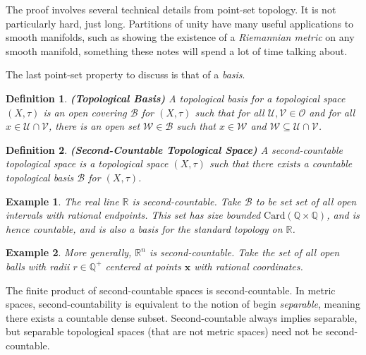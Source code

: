 \documentclass{article}
\theoremstyle{plain}
\theoremstyle{normal}
\newtheorem{definition}{Definition}[section]
\newtheorem{example}{Example}[section]
\begin{document}
        The proof involves several technical details from point-set topology.
        It is not particularly hard, just long. Partitions of unity have many
        useful applications to smooth manifolds, such as showing the existence
        of a \textit{Riemannian metric} on any smooth manifold, something these
        notes will spend a lot of time talking about.
        \par\hfill\par
        The last point-set property to discuss is that of a \textit{basis}.
        \begin{definition}{\textbf{(Topological Basis)}}
            A topological basis for a topological space $(X,\tau)$ is an open
            covering $\mathcal{B}$ for $(X,\tau)$ such that for all
            $\mathcal{U},\mathcal{V}\in\mathcal{O}$ and for all
            $x\in\mathcal{U}\cap\mathcal{V}$, there is an open set
            $\mathcal{W}\in\mathcal{B}$ such that $x\in\mathcal{W}$ and
            $\mathcal{W}\subseteq\mathcal{U}\cap\mathcal{V}$.
        \end{definition}
        \begin{definition}{\textbf{(Second-Countable Topological Space)}}
            A second-countable topological space is a topological space
            $(X,\tau)$ such that there exists a countable topological basis
            $\mathcal{B}$ for $(X,\tau)$.
        \end{definition}
        \begin{example}
            The real line $\mathbb{R}$ is second-countable. Take $\mathcal{B}$
            to be set set of all open intervals with rational endpoints. This
            set has size bounded $\textrm{Card}(\mathbb{Q}\times\mathbb{Q})$,
            and is hence countable, and is also a basis for the standard
            topology on $\mathbb{R}$.
        \end{example}
        \begin{example}
            More generally, $\mathbb{R}^{n}$ is second-countable. Take the set
            of all open balls with radii $r\in\mathbb{Q}^{+}$ centered at
            points $\mathbf{x}$ with rational coordinates.
        \end{example}
        The finite product of second-countable spaces is second-countable.
        In metric spaces, second-countability is equivalent to the notion of
        begin \textit{separable}, meaning there exists a countable dense
        subset. Second-countable always implies separable, but separable
        topological spaces (that are not metric spaces) need not be
        second-countable.
\end{document}
